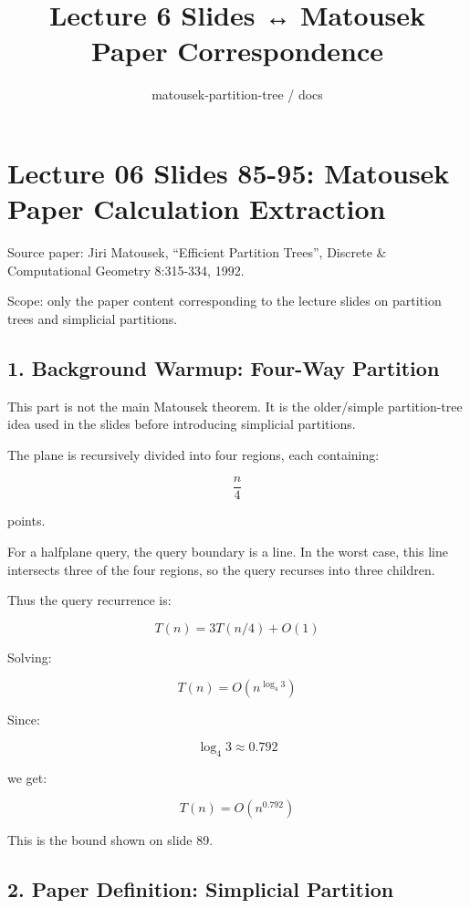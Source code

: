 \documentclass[
  11pt,
]{article}
\title{Lecture 6 Slides ↔ Matousek Paper Correspondence}
\subtitle{matousek-partition-tree / docs}
\author{}
\date{}
\begin{document}
\maketitle

{
\hypersetup{linkcolor=}
\setcounter{tocdepth}{3}
\tableofcontents
}
\hypertarget{lecture-06-slides-85-95-matousek-paper-calculation-extraction}{%
\section{Lecture 06 Slides 85-95: Matousek Paper Calculation
Extraction}\label{lecture-06-slides-85-95-matousek-paper-calculation-extraction}}

Source paper: Jiri Matousek, ``Efficient Partition Trees'', Discrete \&
Computational Geometry 8:315-334, 1992.

Scope: only the paper content corresponding to the lecture slides on
partition trees and simplicial partitions.

\hypertarget{background-warmup-four-way-partition}{%
\subsection{1. Background Warmup: Four-Way
Partition}\label{background-warmup-four-way-partition}}

This part is not the main Matousek theorem. It is the older/simple
partition-tree idea used in the slides before introducing simplicial
partitions.

The plane is recursively divided into four regions, each containing:

\[
\frac n4
\]

points.

For a halfplane query, the query boundary is a line. In the worst case,
this line intersects three of the four regions, so the query recurses
into three children.

Thus the query recurrence is:

\[
T(n)=3T(n/4)+O(1)
\]

Solving:

\[
T(n)=O(n^{\log_4 3})
\]

Since:

\[
\log_4 3\approx 0.792
\]

we get:

\[
T(n)=O(n^{0.792})
\]

This is the bound shown on slide 89.

\hypertarget{paper-definition-simplicial-partition}{%
\subsection{2. Paper Definition: Simplicial
Partition}\label{paper-definition-simplicial-partition}}
\end{document}
